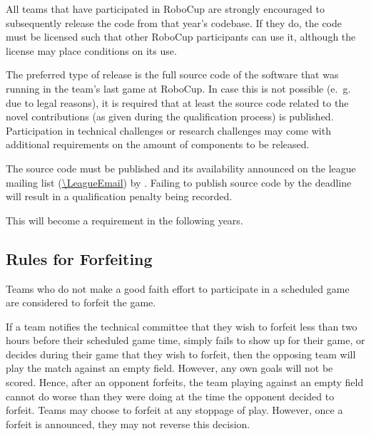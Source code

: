 All teams that have participated in RoboCup are strongly encouraged to subsequently release the code from that year's codebase. If they do, the code must be licensed such that other RoboCup participants can use it, although the license may place conditions on its use.

The preferred type of release is the full source code of the software that was running in the team's last game at RoboCup. In case this is not possible (e.~g. due to legal reasons), it is required that at least the source code related to the novel contributions (as given during the qualification process) is published. Participation in technical challenges or research challenges may come with additional requirements on the amount of components to be released.

The source code must be published and its availability announced on the league mailing list (\url{\LeagueEmail}) by \DTMdate{\CodeReleaseAnnouncementDate}.
Failing to publish source code by the deadline will result in a qualification penalty being recorded.

This will become a requirement in the following years.






\subsection{Rules for Forfeiting}
\label{sec:forfeit}

Teams who do not make a good faith effort to participate in a scheduled game are considered to forfeit the game.

If a team notifies the technical committee that they wish to forfeit less than two hours before their scheduled game time, simply fails to show up for their game, or decides during their game that they wish to forfeit, then the opposing team will play the match against an empty field.
However, any own goals will not be scored.
Hence, after an opponent forfeits, the team playing against an empty field cannot do worse than they were doing at the time the opponent decided to forfeit.
Teams may choose to forfeit at any stoppage of play.
However, once a forfeit is announced, they may not reverse this decision.

